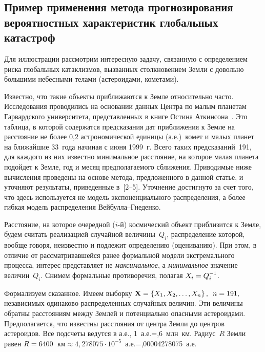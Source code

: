 \begin{multicols}{2}
\section{Пример применения метода прогнозирования вероятностных характеристик 
глобальных катастроф}

Для иллюстрации рассмотрим интересную задачу, связанную с
определением риска глобальных катаклизмов, вызванных столкновением
Земли с довольно большими небесными телами (астероидами, кометами).

Известно, что такие объекты приближаются к Земле относительно часто.
Исследования проводились на основании данных Центра по малым
планетам Гарвардского университета, представленных в книге Остина
Аткинсона~\cite{Atkinson2001}. Это таблица, в которой содержатся
предсказания дат приближения к Земле на расстояние не более 0,2
астрономической единицы (а.е.)\ комет и малых планет на
ближайшие 33~года начиная с июня 1999~г. Всего таких предсказаний~191, 
для каждого из них известно минимальное расстояние, на которое
малая планета подойдет к Земле, год и месяц предполагаемого
сближения. 
Приводимые ниже вычисления проведены на основе метода,
предложенного в данной статье, и уточняют результаты, приведенные в~[2--5]. 
Уточнение достигнуто за счет того, что здесь используется не
модель экспоненциального распределения, а более гибкая модель
распределения Вей\-бул\-ла--Гне\-денко.

Расстояние, на которое очередной ($i$-й) космический объект
приблизится к Земле, будем считать реализацией случайной величины~$Q_i$, 
распределение которой, вообще говоря, неизвестно и подлежит
определению (оцениванию). При этом, в отличие от рассматривавшейся
ранее формальной модели экстремального процесса, интерес
представляет не {\it максимальное}, а \textit{минимальное} значение
величин~$Q_i$. Снимем формальные противоречия, полагая
$X_i\hm=Q_i^{-1}$.

Формализуем сказанное. Имеем выборку
$\mathbf{X}\hm=\{X_1,X_2,\ldots ,X_n\}\,,\enskip n=191,$
 независимых одинаково
распределенных случайных величин. Эти величины обратны расстояниям
между Землей и потенциально опасными астероидами. Предполагается,
что известны расстояния от центра Земли до центров астероидов. Все
подсчеты ведутся в а.е., 1~а.е.\;=,6~млн~км.
Радиус~$R$ Земли равен $R\hm=6400$~км\;$\approx 4{,}278075\cdot
10^{-5}$~а.е.\;=,00004278075~а.е. 


\end{multicols}
